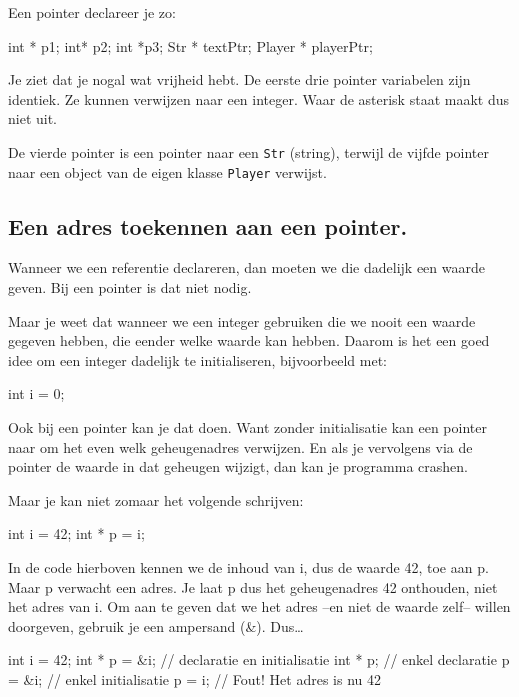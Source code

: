Een pointer declareer je zo:

\begin{code}
int * p1;
int* p2;
int *p3;
Str * textPtr;
Player * playerPtr;
\end{code}

Je ziet dat je nogal wat vrijheid hebt. De eerste drie pointer variabelen zijn identiek. Ze kunnen verwijzen naar een integer. Waar de asterisk staat maakt dus niet uit.

De vierde pointer is een pointer naar een \texttt{Str} (string), terwijl de vijfde pointer naar een object van de eigen klasse \texttt{Player} verwijst.

\subsection{Een adres toekennen aan een pointer.}
Wanneer we een referentie declareren, dan moeten we die dadelijk een waarde geven. Bij een pointer is dat niet nodig.

Maar je weet dat wanneer we een integer gebruiken die we nooit een waarde gegeven hebben, die eender welke waarde kan hebben. Daarom is het een goed idee om een integer dadelijk te initialiseren, bijvoorbeeld met:

\begin{code}
int i = 0;
\end{code}

Ook bij een pointer kan je dat doen. Want zonder initialisatie kan een pointer naar om het even welk geheugenadres verwijzen. En als je vervolgens via de pointer de waarde in dat geheugen wijzigt, dan kan je programma crashen.

Maar je kan niet zomaar het volgende schrijven:
\begin{code}
int i = 42;
int * p = i;
\end{code}

In de code hierboven kennen we de inhoud van i, dus de waarde 42, toe aan p. Maar p verwacht een adres. Je laat p dus het geheugenadres 42 onthouden, niet het adres van i. Om aan te geven dat we het adres --en niet de waarde zelf-- willen doorgeven, gebruik je een ampersand (\&). Dus\ldots

\begin{code}
int   i = 42;
int * p = &i; // declaratie en initialisatie
int * p;      // enkel declaratie
p       = &i; // enkel initialisatie
p       =  i; // Fout! Het adres is nu 42 
\end{code}    

